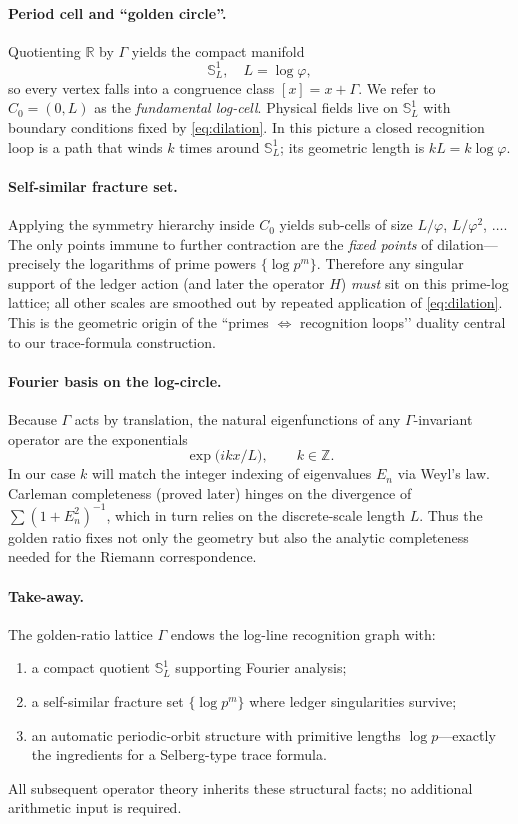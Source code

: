 \documentclass[11pt]{article}
\begin{document}
\paragraph{Period cell and ``golden circle''.}
Quotienting $\mathbb R$ by $\Gamma$ yields the compact manifold
\[
   \mathbb S^{1}_{L},
   \quad
   L=\log\varphi,
\]
so every vertex falls into a congruence class
$[x]=x+\Gamma$.  We refer to $C_{0}=(0,L)$ as the
\emph{fundamental log-cell}.  Physical fields live on
$\mathbb S^{1}_{L}$ with boundary conditions fixed by
\eqref{eq:dilation}.  In this picture a closed recognition loop is a
path that winds $k$ times around $\mathbb S^{1}_{L}$; its geometric
length is $kL=k\log\varphi$.

\paragraph{Self-similar fracture set.}
Applying the symmetry hierarchy inside $C_{0}$ yields sub-cells of size
$L/\varphi$, $L/\varphi^{2}$, $\dots$.
The only points immune to further contraction are the
\emph{fixed points} of dilation—precisely the logarithms of prime powers
$\{\log p^{m}\}$.  
Therefore any singular support of the ledger action (and later the
operator $H$) \emph{must} sit on this prime-log lattice; all other
scales are smoothed out by repeated application of 
\eqref{eq:dilation}.  This is the geometric origin of the
“primes $\Longleftrightarrow$ recognition loops’’ duality central to our
trace-formula construction.

\paragraph{Fourier basis on the log-circle.}
Because $\Gamma$ acts by translation, the natural eigenfunctions of any
$\Gamma$-invariant operator are the exponentials
\[
   \exp\!\bigl(i k x/L\bigr),
   \qquad k\in\mathbb Z.
\]
In our case $k$ will match the integer indexing of eigenvalues
$E_{n}$ via Weyl’s law.  Carleman completeness (proved later) hinges on
the divergence of 
$\sum (1+E_{n}^{2})^{-1}$, which in turn relies on the discrete-scale
length $L$.  Thus the golden ratio fixes not only the geometry but also
the analytic completeness needed for the Riemann correspondence.

\paragraph{Take-away.}
The golden-ratio lattice $\Gamma$ endows the log-line recognition graph
with:
\begin{enumerate}
\item a compact quotient $\mathbb S^{1}_{L}$ supporting Fourier
      analysis;
\item a self-similar fracture set $\{\log p^{m}\}$ where ledger
      singularities survive;
\item an automatic periodic-orbit structure with primitive lengths
      $\log p$—exactly the ingredients for a Selberg-type trace formula.
\end{enumerate}
All subsequent operator theory inherits these structural facts; no
additional arithmetic input is required.
\end{document}
